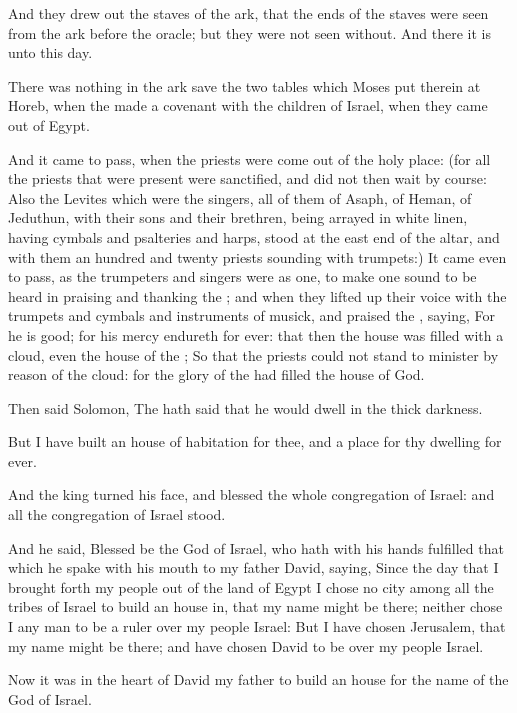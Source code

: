 \Verse And they drew out the staves of the ark, that the ends of the staves were seen from the ark before the oracle; but they were not seen without. And there it is unto this day.

\Verse There was nothing in the ark save the two tables which Moses put therein at Horeb, when the \LORD made a covenant with the children of Israel, when they came out of Egypt.

\Verse And it came to pass, when the priests were come out of the holy place: (for all the priests that were present were sanctified, and did not then wait by course: \Verse Also the Levites which were the singers, all of them of Asaph, of Heman, of Jeduthun, with their sons and their brethren, being arrayed in white linen, having cymbals and psalteries and harps, stood at the east end of the altar, and with them an hundred and twenty priests sounding with trumpets:) \Verse It came even to pass, as the trumpeters and singers were as one, to make one sound to be heard in praising and thanking the \LORD; and when they lifted up their voice with the trumpets and cymbals and instruments of musick, and praised the \LORD, saying, For he is good; for his mercy endureth for ever: that then the house was filled with a cloud, even the house of the \LORD; \Verse So that the priests could not stand to minister by reason of the cloud: for the glory of the \LORD had filled the house of God.


\Chapter
\Verse Then said Solomon, The \LORD hath said that he would dwell in the thick darkness.

\Verse But I have built an house of habitation for thee, and a place for thy dwelling for ever.

\Verse And the king turned his face, and blessed the whole congregation of Israel: and all the congregation of Israel stood.

\Verse And he said, Blessed be the \LORD God of Israel, who hath with his hands fulfilled that which he spake with his mouth to my father David, saying, \Verse Since the day that I brought forth my people out of the land of Egypt I chose no city among all the tribes of Israel to build an house in, that my name might be there; neither chose I any man to be a ruler over my people Israel: \Verse But I have chosen Jerusalem, that my name might be there; and have chosen David to be over my people Israel.

\Verse Now it was in the heart of David my father to build an house for the name of the \LORD God of Israel.

